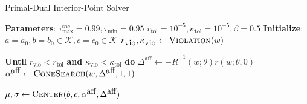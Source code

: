 \begin{algorithm}[H]
	\caption{Primal-Dual Interior-Point Solver} \label{dojo_interiorpoint}
	\begin{algorithmic}[1]
		\State \textbf{Parameters}: $\tau^{\mbox{soc}}_{\mbox{max}} = 0.99, \tau_{\mbox{min}} = 0.95$
		\State $r_{\mbox{tol}} = 10^{-5}, \kappa_{\mbox{tol}} = 10^{-5}, \beta = 0.5$
		\State \textbf{Initialize}: $a = a_0, b = b_0 \in \mathcal{K}, c = c_0 \in \mathcal{K}$
		\State $r_{\mbox{vio}}, \kappa_{\mbox{vio}} \gets \Call{Violation}{w}$ \Comment{(\ref{dojo_r_vio}, \ref{dojo_kappa_vio})}
		
		\State \textbf{Until} $r_{\mbox{vio}} < r_{\mbox{tol}}$ \textbf{and} $\kappa_{\mbox{vio}} < \kappa_{\mbox{tol}}$ \textbf{do} 
		\State \indent \hspace{-4mm} $\Delta^{\mbox{aff}} \gets  - \bar{R}^{-1}(w; \theta) r(w; \theta, 0)$
		\State \indent \hspace{-4mm} $\alpha^{\mbox{aff}} \gets \Call{ConeSearch}{w, \Delta^{\mbox{aff}}, 1, 1}$
		
		\State \indent \hspace{-4mm} $\mu, \sigma \gets  \Call{Center}{b, c, \alpha^{\mbox{aff}}, \Delta^{\mbox{aff}}} $ \Comment{(\ref{dojo_centering_0}-\ref{dojo_centering_3})}
		

\end{algorithmic}
\end{algorithm}
